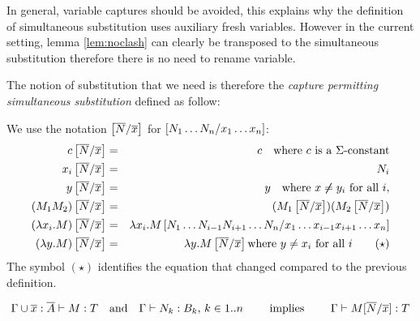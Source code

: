 In general, variable captures should be avoided, this explains why
the definition of simultaneous substitution uses auxiliary fresh
variables. However in the current setting, lemma \ref{lem:noclash}
can clearly be transposed to the simultaneous substitution therefore
there is no need to rename variable.

The notion of substitution that we need is therefore the
\emph{capture permitting simultaneous substitution} defined as
follow:

\begin{dfn}
 We use the notation
$\left[ \overline{N}/\overline{x} \right]$ for $\left[ N_1 \ldots N_n/x_1
\ldots x_n \right]$:
\begin{eqnarray*}
c \left[ \overline{N}/\overline{x} \right] &=& c \quad \mbox{where $c$ is a $\Sigma$-constant}\\
 x_i \left[ \overline{N}/\overline{x} \right] &=& N_i\\
 y \left[ \overline{N}/\overline{x} \right] &=& y \quad \mbox{where } x \not \neq y_i \mbox{ for all } i,\\
(M_1 M_2) \left[ \overline{N}/\overline{x} \right] &=& (M_1 \left[ \overline{N}/\overline{x} \right]) (M_2 \left[ \overline{N}/\overline{x} \right])\\
(\lambda x_i . M) \left[ \overline{N}/\overline{x} \right] &=& \lambda x_i
. M
\left[ N_1 \ldots N_{i-1} N_{i+1}\ldots N_n/x_1 \ldots x_{i-1} x_{i+1}\ldots x_n \right] \\
(\lambda y . M) \left[ \overline{N}/\overline{x} \right] &=& \lambda y . M
\left[ \overline{N}/\overline{x} \right] \mbox{where $y \not = x_i$ for
all $i$} \qquad \mathbf{(\star)}
\end{eqnarray*}
The symbol $\mathbf{(\star)}$ identifies the equation that changed
compared to the previous definition.
\end{dfn}

\begin{lem}
\label{lem:subst_preserve_i}
$$ \Gamma\cup \overline{x} : \overline{A}\vdash M : T
\quad \mbox{and} \quad \Gamma \vdash N_k : B_k \mbox{, } k \in
1..n \qquad \mbox{ implies } \qquad \Gamma \vdash
M[\overline{N}/\overline{x}] : T$$
\end{lem}

